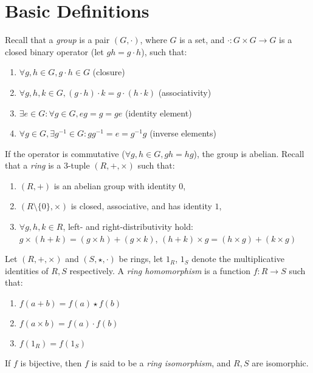 \section{Basic Definitions}

Recall that a {\em group} is a pair $(G, \cdot)$, where $G$ is a set, and
$\cdot: G \times G \to G$ is a closed binary operator (let $gh = g \cdot h$),
such that:
\begin{enumerate}
  \item $\forall g, h \in G, g \cdot h \in G$ (closure)
  \item $\forall g, h, k \in G, (g \cdot h) \cdot k = g \cdot (h \cdot k)$
  (associativity)
  \item $\exists e \in G: \forall g \in G, eg = g = ge$ (identity
  element)
  \item $\forall g \in G, \exists g^{-1} \in G: gg^{-1} = e = g^{-1}g$ (inverse
  elements)
\end{enumerate}
If the operator is commutative ($\forall g, h \in G, gh = hg$), the group is
abelian.
Recall that a {\em ring} is a 3-tuple $(R, +, \times)$ such that:
\begin{enumerate}
  \item $(R, +)$ is an abelian group with identity $0$,
  \item $(R \setminus \{0\}, \times)$ is closed, associative, and has identity
  $1$,
  \item $\forall g, h, k \in R$, left- and right-distributivity hold: $g \times
  (h + k) = (g \times h) + (g \times k)$, $(h + k) \times g = (h \times g) +
  (k \times g)$
\end{enumerate}

Let $(R, +, \times)$ and $(S, \star, \cdot)$ be rings, let $1_R$, $1_S$ denote
the multiplicative identities of $R, S$ respectively. A {\em ring homomorphism}
is a function $f: R \to S$ such that:
\begin{enumerate}
  \item $f(a+b) = f(a) \star f(b)$
  \item $f(a \times b) = f(a) \cdot f(b)$
  \item $f(1_R) = f(1_S)$
\end{enumerate}
If $f$ is bijective, then $f$ is said to be a {\em ring isomorphism}, and $R, S$
are isomorphic.

